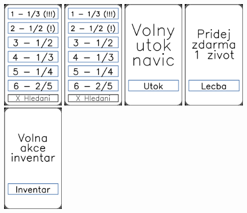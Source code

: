 \documentclass[a4paper]{article}
\begin{document}
	\includegraphics[width=3.0cm]{img-8_10}
	\includegraphics[width=3.0cm]{img-8_11}
	\includegraphics[width=3.0cm]{img-9_0}
	\includegraphics[width=3.0cm]{img-9_1}
	\includegraphics[width=3.0cm]{img-9_2}
\end{document}
